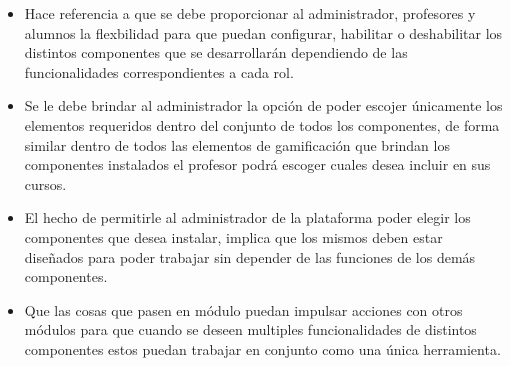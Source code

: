     \begin{multicols}{2}
    \begin{itemize}

    \item[] Hace referencia a que se debe proporcionar al administrador, profesores
            y alumnos la flexbilidad para que puedan configurar, habilitar o deshabilitar
            los distintos componentes que se desarrollarán dependiendo de las funcionalidades
            correspondientes a cada rol.

        
    \item[] Se le debe brindar al administrador la opción de poder escojer únicamente los
            elementos requeridos dentro del conjunto de todos los componentes, de forma similar
            dentro de todos las elementos de gamificación que brindan los componentes instalados
            el profesor podrá escoger cuales desea incluir en sus cursos.



    \item[] El hecho de permitirle al administrador de la plataforma poder elegir los
            componentes que desea instalar, implica que los mismos deben estar diseñados
            para poder trabajar sin depender de las funciones de los demás componentes.


    \item[] Que las cosas que pasen en módulo puedan impulsar acciones con otros módulos
            para que cuando se deseen multiples funcionalidades de distintos componentes
            estos puedan trabajar en conjunto como una única herramienta.
    \end{itemize}
    \end{multicols}
